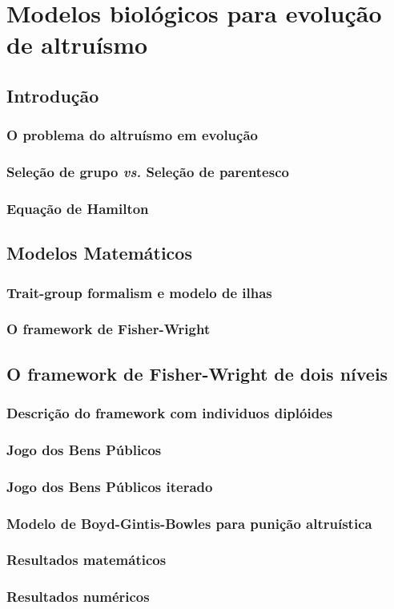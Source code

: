 \chapter{Modelos biológicos para evolução de altruísmo}

\section{Introdução}
\subsection{O problema do altruísmo em evolução}
\subsection{Seleção de grupo \textit{vs.} Seleção de parentesco}
\subsection{Equação de Hamilton}
\section{Modelos Matemáticos}
\subsection{Trait-group formalism e modelo de ilhas}
\subsection{O framework de Fisher-Wright}
\section{O framework de Fisher-Wright de dois níveis}
\subsection{Descrição do framework com individuos diplóides}
\subsection{Jogo dos Bens Públicos}
\subsection{Jogo dos Bens Públicos iterado}
\subsection{Modelo de Boyd-Gintis-Bowles para punição altruística}
\subsection{Resultados matemáticos}
\subsection{Resultados numéricos}

